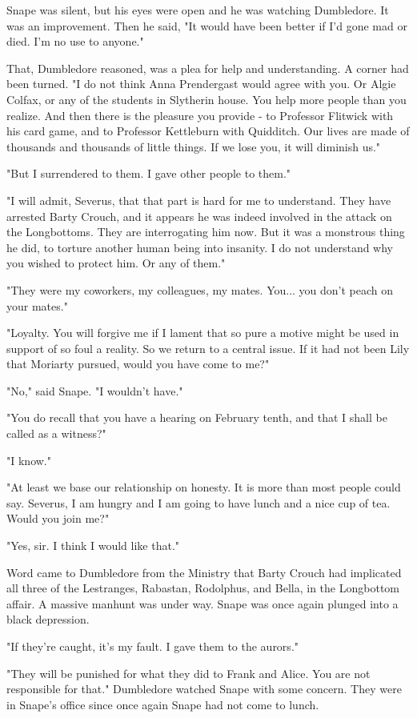 Snape was silent, but his eyes were open and he was watching Dumbledore. It was an improvement. Then he said, "It would have been better if I'd gone mad or died. I'm no use to anyone."

That, Dumbledore reasoned, was a plea for help and understanding. A corner had been turned. "I do not think Anna Prendergast would agree with you. Or Algie Colfax, or any of the students in Slytherin house. You help more people than you realize. And then there is the pleasure you provide - to Professor Flitwick with his card game, and to Professor Kettleburn with Quidditch. Our lives are made of thousands and thousands of little things. If we lose you, it will diminish us."

"But I surrendered to them. I gave other people to them."

"I will admit, Severus, that that part is hard for me to understand. They have arrested Barty Crouch, and it appears he was indeed involved in the attack on the Longbottoms. They are interrogating him now. But it was a monstrous thing he did, to torture another human being into insanity. I do not understand why you wished to protect him. Or any of them."

"They were my coworkers, my colleagues, my mates. You... you don't peach on your mates."

"Loyalty. You will forgive me if I lament that so pure a motive might be used in support of so foul a reality. So we return to a central issue. If it had not been Lily that Moriarty pursued, would you have come to me?"

"No," said Snape. "I wouldn't have."

"You do recall that you have a hearing on February tenth, and that I shall be called as a witness?"

"I know."

"At least we base our relationship on honesty. It is more than most people could say. Severus, I am hungry and I am going to have lunch and a nice cup of tea. Would you join me?"

"Yes, sir. I think I would like that."

Word came to Dumbledore from the Ministry that Barty Crouch had implicated all three of the Lestranges, Rabastan, Rodolphus, and Bella, in the Longbottom affair. A massive manhunt was under way. Snape was once again plunged into a black depression.

"If they're caught, it's my fault. I gave them to the aurors."

"They will be punished for what they did to Frank and Alice. You are not responsible for that." Dumbledore watched Snape with some concern. They were in Snape's office since once again Snape had not come to lunch.


